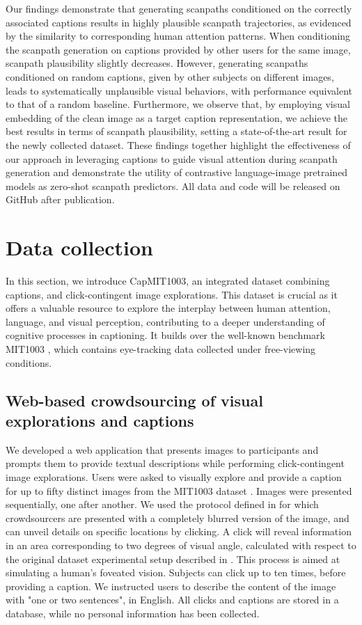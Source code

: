 \documentclass{article}
\begin{document}
Our findings demonstrate that generating scanpaths conditioned on the correctly associated captions results in highly plausible scanpath trajectories, as evidenced by the similarity to corresponding human attention patterns. When conditioning the scanpath generation on captions provided by other users for the same image, scanpath plausibility slightly decreases. However, generating scanpaths conditioned on random captions, given by other subjects on different images, leads to systematically unplausible visual behaviors, with performance equivalent to that of a random baseline. Furthermore, we observe that, by employing visual embedding of the clean image as a target caption representation, we achieve the best results in terms of scanpath plausibility, setting a state-of-the-art result for the newly collected dataset. These findings together highlight the effectiveness of our approach in leveraging captions to guide visual attention during scanpath generation and demonstrate the utility of contrastive language-image pretrained models as zero-shot scanpath predictors. All data and code will be released on GitHub after publication.



\section{Data collection}
In this section, we introduce CapMIT1003, an integrated dataset combining captions, and click-contingent image explorations. This dataset is crucial as it  offers a valuable resource to explore the interplay between human attention, language, and visual perception, contributing to a deeper understanding of cognitive processes in captioning. It builds over the well-known benchmark MIT1003 \citep{judd2009learning}, which contains eye-tracking data collected under free-viewing conditions.

\subsection{Web-based crowdsourcing of visual explorations and captions}
We developed a web application that presents images to participants and prompts them to provide textual descriptions while performing click-contingent image explorations. Users were asked to visually explore and provide a caption for up to fifty distinct images from the MIT1003 dataset \citep{judd2009learning}. Images were presented sequentially, one after another. We used the protocol defined in \citet{jiang2015salicon} for which crowdsourcers are presented with a completely blurred version of the image, and can unveil details on specific locations by clicking. A click will reveal information in an area corresponding to two degrees of visual angle, calculated with respect to the original dataset experimental setup described in \citep{judd2009learning}. This process is aimed at simulating a human's foveated vision. Subjects can click up to ten times, before providing a caption. We instructed users to describe the content of the image with "one or two sentences", in English. All clicks and captions are stored in a database, while no personal information has been collected.
\end{document}
